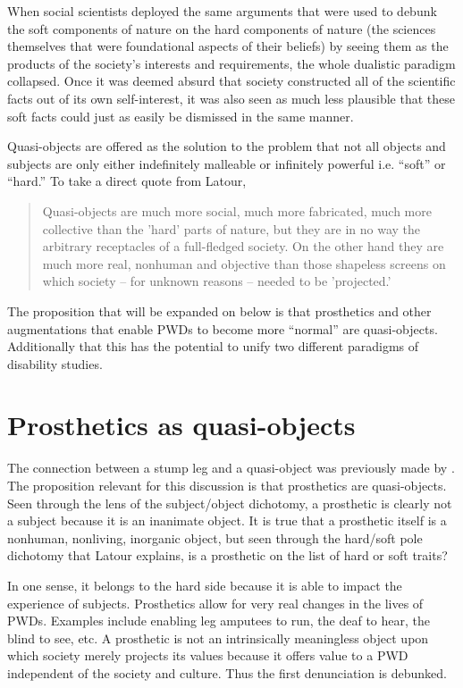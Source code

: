\documentclass[a4paper]{article}
\begin{document}
\begin{appendices}
When social scientists deployed the same arguments that were used to debunk
the soft components of nature on the hard components of nature (the sciences
themselves that were foundational aspects of their beliefs) by seeing them as
the products of the society's interests and requirements, the whole dualistic
paradigm collapsed. Once it was deemed absurd that society constructed all of
the scientific facts out of its own self-interest, it was also seen as much
less plausible that these soft facts could just as easily be dismissed in the
same manner.

Quasi-objects are offered as the solution to the problem that not all objects
and subjects are only either indefinitely malleable or infinitely powerful
i.e. ``soft'' or ``hard.'' To take a direct quote from Latour,

\begin{quote}
Quasi-objects are much more social, much more fabricated, much more
collective than the 'hard' parts of nature, but they are in no way the
arbitrary receptacles of a full-fledged society. On the other hand they are
much more real, nonhuman and objective than those shapeless screens on which
society – for unknown reasons – needed to be 'projected.' \citep{latour2012we}
\end{quote}

The proposition that will be expanded on below is that prosthetics and other
augmentations that enable PWDs to become more ``normal'' are quasi-objects.
Additionally that this has the potential to unify two different paradigms of
disability studies.

\section{Prosthetics as quasi-objects}
\label{pros-quasi}

The connection between a stump leg and a quasi-object was previously made by
\cite{bertram2018bestial}. The proposition relevant for this discussion is
that prosthetics are quasi-objects. Seen through the lens of the
subject/object dichotomy, a prosthetic is clearly not a subject because it is
an inanimate object. It is true that a prosthetic itself is a nonhuman,
nonliving, inorganic object, but seen through the hard/soft pole dichotomy
that Latour explains, is a prosthetic on the list of hard or soft traits?

In one sense, it belongs to the hard side because it is able to impact the
experience of subjects. Prosthetics allow for very real changes in the lives
of PWDs. Examples include enabling leg amputees to run, the deaf to hear, the
blind to see, etc. A prosthetic is not an intrinsically meaningless object
upon which society merely projects its values because it offers value to a PWD
independent of the society and culture. Thus the first denunciation is
debunked.


\end{appendices}
\end{document}
